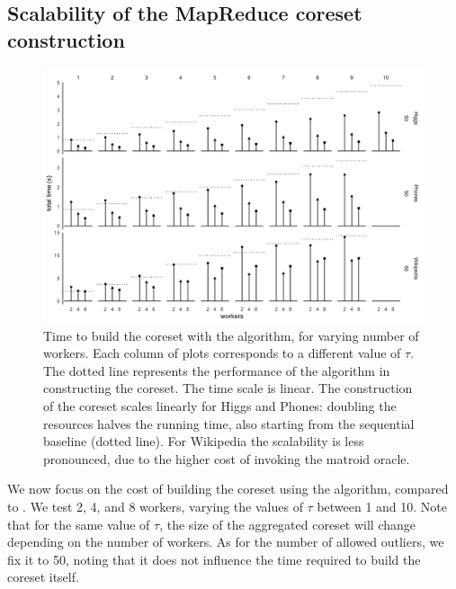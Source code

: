 \subsection{Scalability of the MapReduce coreset construction}
\label{sec:exp:mapreduce}

\begin{figure}
    \includegraphics[width=\textwidth]{mr-time}
    \caption{
        \label{fig:mr-coreset-time}
        Time to build the coreset with the \mapr algorithm, for varying number of workers.
        Each column of plots corresponds to a different value of $\tau$.
        The dotted line represents the performance of the \seq algorithm in constructing the coreset.
        The time scale is linear.
        The construction of the coreset scales linearly for Higgs and Phones: doubling 
        the resources halves the running time, also starting from the sequential baseline 
        (dotted line). For Wikipedia the scalability is 
        less pronounced, due to the higher cost of invoking the matroid oracle.
    }
\end{figure}

We now focus on the cost of building the coreset using the \mapr algorithm, compared to \seq.
We test 2, 4, and 8 workers, varying the values of $\tau$ between 1 and 10. Note that for the same value
of $\tau$, the size of the aggregated coreset will change depending on the number of workers.
As for the number of allowed outliers, we fix it to 50, noting that it does not influence the 
time required to build the coreset itself.

